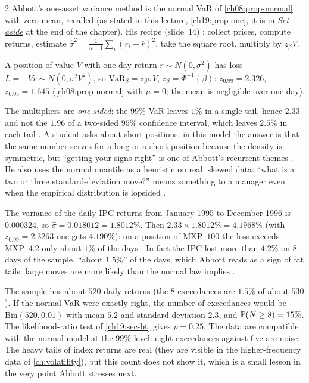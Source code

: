 \begin{paracol}{2}
Abbott's one-asset variance method is the normal VaR of \cref{ch08:prop-normal} with zero mean, recalled \inmargin{} (as stated in this lecture, \cref{ch19:prop-one}, it is in \hyperref[ch19:sec-setaside]{\emph{Set aside}} at the end of the chapter). His recipe (slide~14) : collect prices, compute returns, estimate $\hat\sigma^2=\frac1{n-1}\sum_i(r_i-\bar r)^2$, take the square root, multiply by $z_\beta V$.
\begin{recall}
A position of value $V$ with one-day return $r\sim N(0,\sigma^2)$ has loss $L=-Vr\sim N(0,\sigma^2V^2)$, so $\mathrm{VaR}_\beta=z_\beta\sigma V$, $z_\beta=\Phi^{-1}(\beta)$: $z_{0.99}=2.326$, $z_{0.95}=1.645$ (\cref{ch08:prop-normal} with $\mu=0$; the mean is negligible over one day).
\end{recall}
The multipliers are \emph{one-sided}: the $99\%$ VaR leaves $1\%$ in a single tail, hence $2.33$ and not the $1.96$ of a two-sided $95\%$ confidence interval, which leaves $2.5\%$ in each tail . A student asks about short positions; in this model the answer is that the same number serves for a long or a short position because the density is symmetric, but ``getting your signs right'' is one of Abbott's recurrent themes . He also uses the normal quantile as a heuristic on real, skewed data: ``what is a two or three standard-deviation move?'' means something to a manager even when the empirical distribution is lopsided .

\begin{example}\label{ch19:ex-ipc}
The variance of the daily IPC returns from January 1995 to December 1996 is $0.000324$, so $\hat\sigma=0.018012=1.8012\%$. Then $2.33\times1.8012\%=4.1968\%$ (with $z_{0.99}=2.3263$ one gets $4.190\%$): on a position of MXP~$100$ the loss exceeds MXP~$4.2$ only about $1\%$ of the days .
In fact the IPC lost more than $4.2\%$ on $8$ days of the sample, ``about $1.5\%$'' of the days, which Abbott reads as a sign of fat tails: large moves are more likely than the normal law implies .
\end{example}
\begin{remark}\label{ch19:rem-eight}
The sample has about $520$ daily returns (the $8$ exceedances are $1.5\%$ of about $530$). If the normal VaR were exactly right, the number of exceedances would be $\mathrm{Bin}(520,0.01)$ with mean $5.2$ and standard deviation $2.3$, and $\mathbb{P}(N\ge8)=15\%$. The likelihood-ratio test of \cref{ch19:sec-bt} gives $p=0.25$. The data are compatible with the normal model at the $99\%$ level: eight exceedances against five are noise. The heavy tails of index returns are real (they are visible in the higher-frequency data of \cref{ch:volatility}), but this count does not show it, which is a small lesson in the very point Abbott stresses next.
\end{remark}


\end{paracol}
